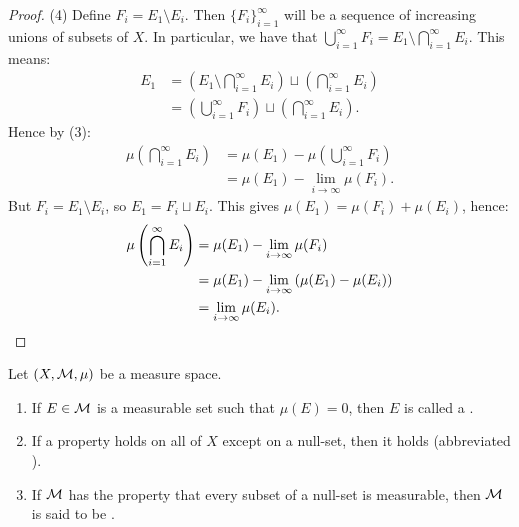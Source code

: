 \begin{proof}
            (4) Define $F_i = E_1 \setminus E_i$. Then $\{F_i\}_{i =1}^\infty$ will be a sequence of increasing unions of subsets of $X$. In particular, we have that $\bigcup_{i = 1}^\infty F_i = E_1 \setminus \bigcap_{i = 1}^\infty E_i$. This means:
                \begin{equation*}
                \begin{split}
                    E_1 
                    & = \left( E_1 \setminus \bigcap_{i = 1}^\infty E_i \right) \sqcup \left( \bigcap_{i = 1}^\infty E_i \right) \\
                    & = \left( \bigcup_{i = 1}^\infty F_i \right) \sqcup \left( \bigcap_{i = 1}^\infty E_i \right).
                \end{split}
                \end{equation*}
            Hence by (3):
                \begin{equation*}
                \begin{split}
                    \mu \left( \bigcap_{i = 1}^\infty E_i \right)
                    & = \mu(E_1) - \mu \left( \bigcup_{i = 1}^\infty F_i \right) \\
                    & = \mu(E_1) - \lim_{i \rightarrow \infty} \mu(F_i).
                \end{split}
                \end{equation*}
            But $F_i = E_1 \setminus E_i$, so $E_1 = F_i \sqcup E_i$. This gives $\mu(E_1) = \mu(F_i) + \mu(E_i)$, hence:
                \begin{equation*}
                \begin{split}
                    \mu \left( \bigcap_{i = 1}^\infty E_i \right)
                    & =\mu(E_1) - \lim_{i \rightarrow \infty} \mu(F_i) \\
                    & = \mu(E_1) - \lim_{i \rightarrow \infty} \left( \mu(E_1) - \mu(E_i) \right) \\
                    & = \lim_{i \rightarrow \infty} \mu(E_i). \qedhere
                \end{split}
                \end{equation*}
        \end{proof}

    \begin{definition}
        Let $(X,\mathcal{M},\mu)$ be a measure space. 
        \begin{enumerate}[label = (\arabic*),itemsep=1pt,topsep=3pt]
            \item If $E \in \mathcal{M}$ is a measurable set such that $\mu(E) = 0$, then $E$ is called a .
            \item If a property holds on all of $X$ except on a null-set, then it holds  (abbreviated ).
            \item If $\mathcal{M}$ has the property that every subset of a null-set is measurable, then $\mathcal{M}$ is said to be .
        \end{enumerate}
    \end{definition}

